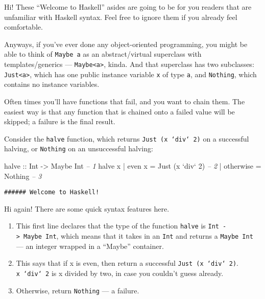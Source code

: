\documentclass[]{article}
\newenvironment{Shaded}{}{}
\newcommand{\DataTypeTok}[1]{\textcolor[rgb]{0.56,0.13,0.00}{{#1}}}
\newcommand{\DecValTok}[1]{\textcolor[rgb]{0.25,0.63,0.44}{{#1}}}
\newcommand{\CommentTok}[1]{\textcolor[rgb]{0.38,0.63,0.69}{\textit{{#1}}}}
\newcommand{\OtherTok}[1]{\textcolor[rgb]{0.00,0.44,0.13}{{#1}}}
\newcommand{\FunctionTok}[1]{\textcolor[rgb]{0.02,0.16,0.49}{{#1}}}
\newcommand{\NormalTok}[1]{{#1}}
\begin{document}
Hi! These ``Welcome to Haskell'' asides are going to be for you readers that are unfamiliar with
Haskell syntax. Feel free to ignore them if you already feel comfortable.

Anyways, if you've ever done any object-oriented programming, you might be able to think of
\texttt{Maybe\ a} as an abstract/virtual superclass with templates/generics ---
\texttt{Maybe\textless{}a\textgreater{}}, kinda. And that superclass has two subclasses:
\texttt{Just\textless{}a\textgreater{}}, which has one public instance variable \texttt{x} of type
\texttt{a}, and \texttt{Nothing}, which contains no instance variables.

Often times you'll have functions that fail, and you want to chain them. The easiest way is that any
function that is chained onto a failed value will be skipped; a failure is the final result.

Consider the \texttt{halve} function, which returns \texttt{Just\ (x\ `div`\ 2)} on a successful
halving, or \texttt{Nothing} on an unsuccessful halving:

\begin{Shaded}
\begin{Highlighting}[]
\OtherTok{halve ::} \DataTypeTok{Int} \OtherTok{->} \DataTypeTok{Maybe} \DataTypeTok{Int}                       \CommentTok{-- 1}
\NormalTok{halve x }\FunctionTok{|} \NormalTok{even x    }\FunctionTok{=} \DataTypeTok{Just} \NormalTok{(x }\OtherTok{`div`} \DecValTok{2}\NormalTok{)          }\CommentTok{-- 2}
        \FunctionTok{|} \NormalTok{otherwise }\FunctionTok{=} \DataTypeTok{Nothing}                   \CommentTok{-- 3}
\end{Highlighting}
\end{Shaded}

\begin{verbatim}
###### Welcome to Haskell!
\end{verbatim}

Hi again! There are some quick syntax features here.

\begin{enumerate}
\def\labelenumi{\arabic{enumi}.}
\tightlist
\item
  This first line declares that the type of the function \texttt{halve} is
  \texttt{Int\ -\textgreater{}\ Maybe\ Int}, which means that it takes in an \texttt{Int} and
  returns a \texttt{Maybe\ Int} --- an integer wrapped in a ``Maybe'' container.
\item
  This says that if x is even, then return a successful \texttt{Just\ (x\ `div`\ 2)}.
  \texttt{x\ `div`\ 2} is x divided by two, in case you couldn't guess already.
\item
  Otherwise, return \texttt{Nothing} --- a failure.
\end{enumerate}
\end{document}
